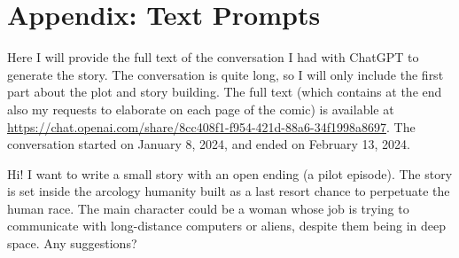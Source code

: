 \section{Appendix: Text Prompts}

Here I will provide the full text of the conversation I had with ChatGPT to generate the story. The conversation is quite long, so I will only include the first part about the plot and story building. The full text (which contains at the end also my requests to elaborate on each page of the comic) is available at \url{https://chat.openai.com/share/8cc408f1-f954-421d-88a6-34f1998a8697}. The conversation started on January 8, 2024, and ended on February 13, 2024.

\begin{qquote}
    Hi! I want to write a small story with an open ending (a pilot episode). The story is set inside the arcology humanity built as a last resort chance to perpetuate the human race. The main character could be a woman whose job is trying to communicate with long-distance computers or aliens, despite them being in deep space. Any suggestions?
\end{qquote}
